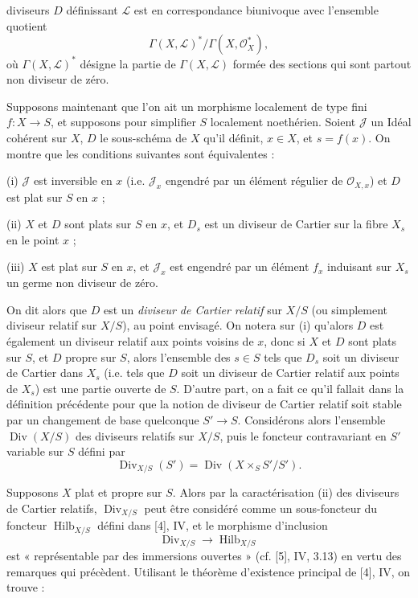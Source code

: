 diviseurs $D$ définissant $\mathcal L$ est en correspondance biunivoque avec
l'ensemble quotient
\[
\Gamma(X,\mathcal L)^*/\Gamma(X,\mathcal O_X^*),
\]
où $\Gamma(X,\mathcal L)^*$ désigne la partie de $\Gamma(X,\mathcal L)$ formée
des sections qui sont partout non diviseur de zéro.

Supposons maintenant que l'on ait un morphisme localement de type fini
$f:X\longrightarrow S$, et supposons pour simplifier $S$ localement noethérien.
Soient $\mathcal J$ un Idéal cohérent sur $X$, $D$ le sous-schéma de $X$ qu'il
définit, $x\in X$, et $s=f(x)$. On montre que les conditions suivantes sont
équivalentes :

\noindent (i) $\mathcal J$ est inversible en $x$ (i.e. $\mathcal J_x$ engendré
par un élément régulier de $\mathcal O_{X,x}$) et $D$ est plat sur $S$ en $x$ ;

\noindent (ii) $X$ et $D$ sont plats sur $S$ en $x$, et $D_s$ est un diviseur
de Cartier sur la fibre $X_s$ en le point $x$ ;

\noindent (iii) $X$ est plat sur $S$ en $x$, et $\mathcal J_x$ est engendré par
un élément $f_x$ induisant sur $X_s$ un germe non diviseur de zéro.

On dit alors que $D$ est un \emph{diviseur de Cartier relatif} sur $X/S$ (ou
simplement diviseur relatif sur $X/S$), au point envisagé. On notera sur (i)
qu'alors $D$ est également un diviseur relatif aux points voisins de $x$, donc
si $X$ et $D$ sont plats sur $S$, et $D$ propre sur $S$, alors l'ensemble des
$s\in S$ tels que $D_s$ soit un diviseur de Cartier dans $X_s$ (i.e. tels que
$D$ soit un diviseur de Cartier relatif aux points de $X_s$) est une partie
ouverte de $S$. D'autre part, on a fait ce qu'il fallait dans la définition
précédente pour que la notion de diviseur de Cartier relatif soit stable par
un changement de base quelconque $S'\longrightarrow S$. Considérons alors
l'ensemble $\operatorname{Div}(X/S)$ des diviseurs relatifs sur $X/S$, puis le
foncteur contravariant en $S'$ variable sur $S$ défini par
\[
\operatorname{Div}_{X/S}(S')=
\operatorname{Div}(X\times_SS'/S').
\]

Supposons $X$ plat et propre sur $S$. Alors par la caractérisation (ii) des
diviseurs de Cartier relatifs, $\operatorname{Div}_{X/S}$ peut être considéré
comme un sous-foncteur du foncteur $\operatorname{Hilb}_{X/S}$ défini dans
[4], IV, et le morphisme d'inclusion
\[
\operatorname{Div}_{X/S}\longrightarrow\operatorname{Hilb}_{X/S}
\]
est « représentable par des immersions ouvertes » (cf. [5], IV, 3.13) en vertu
des remarques qui précèdent. Utilisant le théorème d'existence principal de
[4], IV, on trouve :

